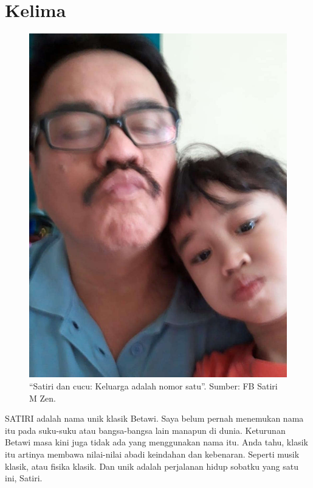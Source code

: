 
\chapter{Kelima}

\begin{figure}[htbp]
\centerline{\includegraphics[scale=1.0]{01-05-01}}
\caption{“Satiri dan cucu: Keluarga adalah nomor satu”. Sumber: FB Satiri M Zen.}
\label{01-05-01}
\end{figure}
%

SATIRI adalah nama unik klasik Betawi. Saya belum pernah menemukan nama itu pada suku-suku atau bangsa-bangsa lain manapun di dunia. Keturunan Betawi masa kini juga tidak ada yang menggunakan nama itu. Anda tahu, klasik itu artinya membawa nilai-nilai abadi keindahan dan kebenaran. Seperti musik klasik, atau fisika klasik. Dan unik adalah perjalanan hidup sobatku yang satu ini, Satiri.

